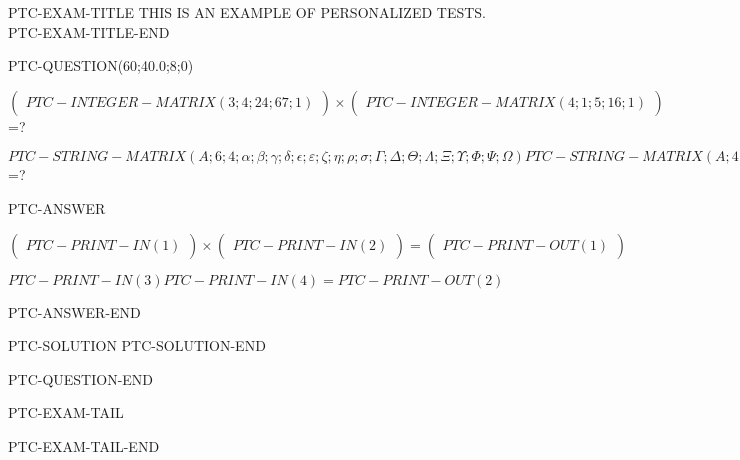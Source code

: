 \documentclass[12pt]{article}
\begin{document}
PTC-EXAM-TITLE
{\Huge  THIS IS AN EXAMPLE OF}
{\Huge  PERSONALIZED TESTS. }
PTC-EXAM-TITLE-END


PTC-QUESTION(60;40.0;8;0)

$ \left( \begin{array}{ccccccccc}
 PTC-INTEGER-MATRIX(3;4;24;67;1)
 \end{array}\right) \times
\left( \begin{array}{c}
 PTC-INTEGER-MATRIX(4;1;5;16;1)
 \end{array}\right) $ =?


$ PTC-STRING-MATRIX(A;6;4; \alpha ; \beta ; \gamma ; \delta ; \epsilon ; \varepsilon ;
                   \zeta ; \eta ; \rho ; \sigma ; \Gamma ; \Delta ; \Theta ; \Lambda ;
                   \Xi ; \Upsilon ; \Phi ; \Psi ; \Omega )
 PTC-STRING-MATRIX(A;4;1; \alpha ; \beta ; \gamma ; \delta ; \epsilon ; \varepsilon ;
                   \zeta ; \eta ; \rho ; \sigma) $ =?

PTC-ANSWER

$\left( \begin{array}{ccccccccccccccc}
 PTC-PRINT-IN(1)
 \end{array}\right) \times
\left( \begin{array}{c}
 PTC-PRINT-IN(2)
 \end{array}\right)  =
 \left( \begin{array}{c}
 PTC-PRINT-OUT(1)
 \end{array}\right)  $

$ PTC-PRINT-IN(3)
 PTC-PRINT-IN(4)=
 PTC-PRINT-OUT(2)  $

PTC-ANSWER-END

PTC-SOLUTION
PTC-SOLUTION-END

\vspace{0.3in}
PTC-QUESTION-END





PTC-EXAM-TAIL

PTC-EXAM-TAIL-END
\end{document}
